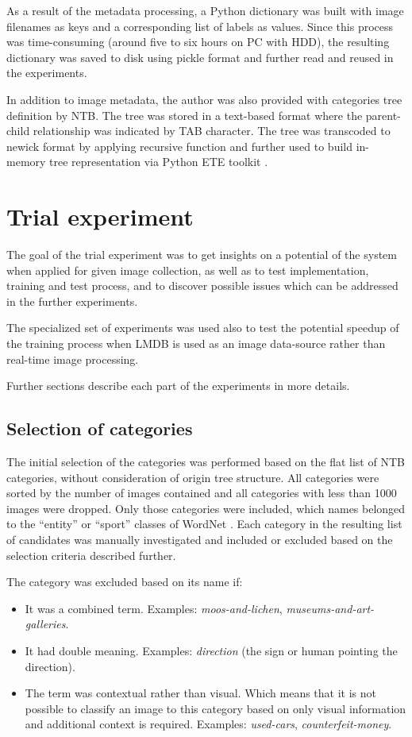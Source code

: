 As a result of the metadata processing, a Python dictionary was built with image filenames as keys and a corresponding list of labels as values. Since this process was time-consuming (around five to six hours on PC with HDD), the resulting dictionary was saved to disk using pickle \cite{pickle} format and further read and reused in the experiments.

In addition to image metadata, the author was also provided with categories tree definition by NTB. The tree was stored in a text-based format where the parent-child relationship was indicated by TAB character. The tree was transcoded to newick \cite{newick} format by applying recursive function and further used to build in-memory tree representation via Python ETE toolkit \cite{ete3}.


\section{Trial experiment}
    The goal of the trial experiment was to get insights on a potential of the system when applied for given image collection, as well as to test implementation, training and test process, and to discover possible issues which can be addressed in the further experiments.
    
    The specialized set of experiments was used also to test the potential speedup of the training process when LMDB is used as an image data-source rather than real-time image processing.
    
    Further sections describe each part of the experiments in more details.
    
    \subsection{Selection of categories}
    \label{sec:trial-cat-selection}
    The initial selection of the categories was performed based on the flat list of NTB categories, without consideration of origin tree structure. All categories were sorted by the number of images contained and all categories with less than 1000 images were dropped. Only those categories were included, which names belonged to the ``entity'' or ``sport'' classes of WordNet \cite{wordnet}. Each category in the resulting list of candidates was manually investigated and included or excluded based on the selection criteria described further.
    
    The category was excluded based on its name if:
    \begin{itemize}
        \item It was a combined term. Examples: \textit{moos-and-lichen}, \textit{museums-and-art-galleries}.
        \item It had double meaning. Examples: \textit{direction} (the sign or human pointing the direction).
        \item The term was contextual rather than visual. Which means that it is not possible to classify an image to this category based on only visual information and additional context is required. Examples: \textit{used-cars}, \textit{counterfeit-money}.
    \end{itemize}
    

